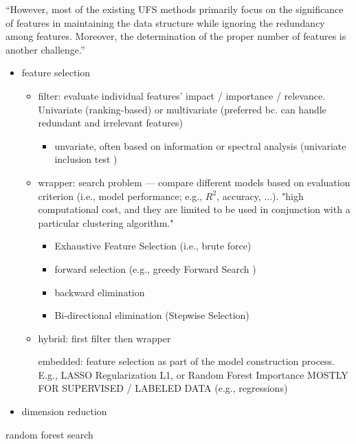 ``However, most of the existing UFS methods primarily focus on the
significance of features in maintaining the data structure while
ignoring the redundancy among features. Moreover, the determination of
the proper number of features is another challenge.''

\begin{itemize}
  \item feature selection
  \begin{itemize}
    \item filter: evaluate individual features' impact / importance / relevance. Univariate (ranking-based) or multivariate (preferred bc. can handle redundant and irrelevant features)
    \begin{itemize}
      \item unvariate, often based on information or spectral analysis (univariate inclusion test \citep[i.e., alpha-corrected t-tests][]{christ2018})
    \end{itemize}
    \item wrapper: search problem --- compare different models based on evaluation criterion (i.e., model performance; e.g., $R^2$, accuracy, ...). "high computational cost, and they are limited to be used in conjunction with a particular clustering algorithm."
    \begin{itemize}
      \item Exhaustive Feature Selection (i.e., brute force)
      \item forward selection (e.g., greedy Forward Search \citep[][]{wang2006})
      \item backward elimination
      \item Bi-directional elimination (Stepwise Selection)
    \end{itemize}
    \item hybrid: first filter then wrapper
    \item [embedded: feature selection as part of the model construction process. E.g., LASSO Regularization L1, or Random Forest Importance] MOSTLY FOR SUPERVISED / LABELED DATA (e.g., regressions)
  \end{itemize}
  \item dimension reduction
\end{itemize}

random forest search \citep[][]{}
